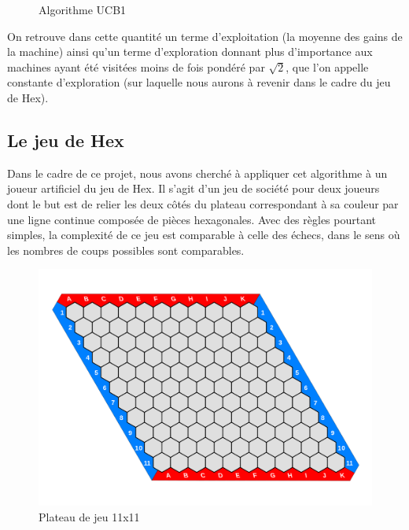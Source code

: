\documentclass[a4paper]{article}
\theoremstyle{definition}
\begin{document}
\begin{figure}[h]
\noindent{}
\caption{Algorithme UCB1}
\end{figure}

On retrouve dans cette quantité un terme d'exploitation (la moyenne des gains de la machine) ainsi qu'un terme d'exploration donnant plus d'importance aux machines ayant été visitées moins de fois pondéré par $\sqrt{2}$, que l'on appelle constante d'exploration (sur laquelle nous aurons à revenir dans le cadre du jeu de Hex).

\clearpage
\subsection{Le jeu de Hex}

Dans le cadre de ce projet, nous avons cherché à appliquer cet algorithme à un joueur artificiel du jeu de Hex. Il s'agit d'un jeu de société pour deux joueurs dont le but est de relier les deux côtés du plateau correspondant à sa couleur par une ligne continue composée de pièces hexagonales. Avec des règles pourtant simples, la complexité de ce jeu est comparable à celle des échecs, dans le sens où les nombres de coups possibles sont comparables.

\begin{figure}[h]
\centering
\includegraphics[scale=0.13]{11x11.png}
\caption{Plateau de jeu 11x11}
\end{figure}
\end{document}

